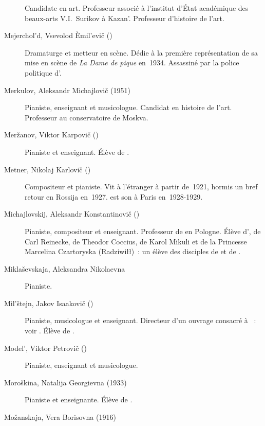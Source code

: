 \begin{description}
 Candidate en art.
 Professeur associé à l'institut d'\hbox{État} académique des beaux-arts
 V.I.~Surikov à Kazan'.
 Professeur d'histoire de l'art.
 \item[Mejerchol'd, Vsevolod Èmil'evič (\Dates{1874}{1940})]%
 Dramaturge et metteur en scène.
 Dédie à \VSofronitsky{} la première représentation de sa mise en scène de
 \emph{La Dame de pique} en~1934.
 Assassiné par la police politique d'\JStaline{}.
 \item[Merkulov, Aleksandr Michajlovič (1951\dvsborn{})]%
 Pianiste, enseignant et musicologue.
 Candidat en histoire de l'art.
 Professeur au conservatoire de Moskva.
 \item[Meržanov, Viktor Karpovič (\Dates{1919}{2012})]%
 Pianiste et enseignant.
 Élève de \SFeinberg{}.
 \item[Metner, Nikolaj Karlovič (\Dates{1880}{1951})]%
 Compositeur et pianiste.
 Vit à l'étranger à partir de~1921, hormis un bref retour en Rossija
 en~1927.
 \VSofronitsky{} est son  à Paris en~1928-1929.
 \item[Michajlovskij, Aleksandr Konstantinovič (\Dates{1851}{1938})]%
 Pianiste, compositeur et enseignant.
 Professeur de \VSofronitsky{} en Pologne.
 Élève d'\IMoscheles{}, de Carl Reinecke, de Theodor Coccius, de Karol
 Mikuli et de la Princesse Marcelina Czartoryska (Radziwiłł)~: un élève des
 disciples de \LBeethoven{} et de \FChopin{}.
 \item[Miklaševskaja, Aleksandra Nikolaevna]%
 Pianiste.
 \item[Mil'štejn, Jakov Isaakovič (\Dates{1911}{1981})]%
 Pianiste, musicologue et enseignant.
 Directeur d'un ouvrage consacré à \VSofronitsky{}~: voir
 \citet{Milshteyn70, Milshteyn82a}.
 Élève de \KIgumnov{}.
 \item[Model', Viktor Petrovič (\Dates{1910}{1981})]%
 Pianiste, enseignant et musicologue.
 \item[Moroškina, Natalija Georgievna (1933\dvsborn{})]%
 Pianiste et enseignante.
 Élève de \VSofronitsky{}.
 \item[Možanskaja, Vera Borisovna (1916\dvsborn{})]%

\end{description}
